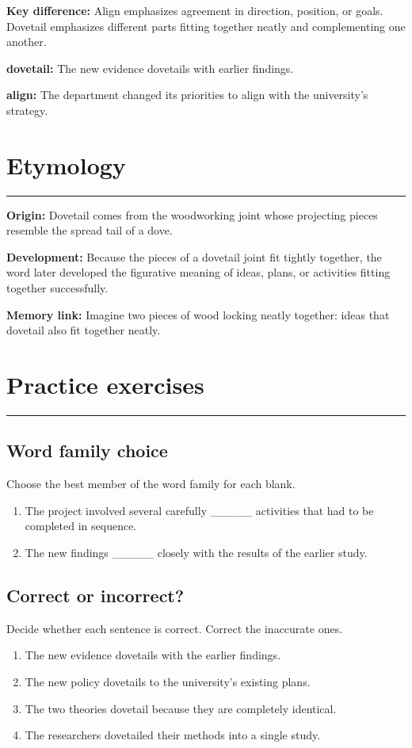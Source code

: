 \documentclass[11pt]{article}
\newcommand{\sectionrule}{\par\vspace{-0.5em}\noindent\textcolor{Accent}{\rule{\linewidth}{0.6pt}}\par}
\begin{document}
\textbf{Key difference:} Align emphasizes agreement in direction, position, or goals. Dovetail emphasizes different parts fitting together neatly and complementing one another.

\textbf{dovetail:} The new evidence dovetails with earlier findings.

\textbf{align:} The department changed its priorities to align with the university's strategy.

\section{Etymology}
\sectionrule
\textbf{Origin:} Dovetail comes from the woodworking joint whose projecting pieces resemble the spread tail of a dove.

\textbf{Development:} Because the pieces of a dovetail joint fit tightly together, the word later developed the figurative meaning of ideas, plans, or activities fitting together successfully.

\textbf{Memory link:} Imagine two pieces of wood locking neatly together: ideas that dovetail also fit together neatly.

\section{Practice exercises}
\sectionrule
\subsection{Word family choice}
Choose the best member of the word family for each blank.

\begin{enumerate}
  \item The project involved several carefully \_\_\_\_\_ activities that had to be completed in sequence.
  \item The new findings \_\_\_\_\_ closely with the results of the earlier study.
\end{enumerate}

\subsection{Correct or incorrect?}
Decide whether each sentence is correct. Correct the inaccurate ones.

\begin{enumerate}
  \item The new evidence dovetails with the earlier findings.
  \item The new policy dovetails to the university's existing plans.
  \item The two theories dovetail because they are completely identical.
  \item The researchers dovetailed their methods into a single study.
\end{enumerate}
\end{document}
